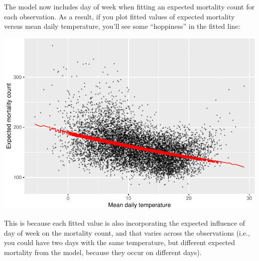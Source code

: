 \documentclass[
]{book}
\newenvironment{Shaded}{\begin{snugshade}}{\end{snugshade}}
\newcommand{\DataTypeTok}[1]{\textcolor[rgb]{0.13,0.29,0.53}{#1}}
\newcommand{\FloatTok}[1]{\textcolor[rgb]{0.00,0.00,0.81}{#1}}
\newcommand{\KeywordTok}[1]{\textcolor[rgb]{0.13,0.29,0.53}{\textbf{#1}}}
\newcommand{\NormalTok}[1]{#1}
\newcommand{\OperatorTok}[1]{\textcolor[rgb]{0.81,0.36,0.00}{\textbf{#1}}}
\newcommand{\StringTok}[1]{\textcolor[rgb]{0.31,0.60,0.02}{#1}}
\begin{document}
The model now includes day of week when fitting an expected mortality count
for each observation. As a result, if you plot fitted values of expected
mortality versus mean daily temperature, you'll see some ``hoppiness'' in the
fitted line:

\begin{Shaded}
\end{Shaded}

\includegraphics{adv_epi_analysis_files/figure-latex/unnamed-chunk-40-1.pdf}

This is because each fitted value is also incorporating the expected influence
of day of week on the mortality count, and that varies across the observations
(i.e., you could have two days with the same temperature, but different
expected mortality from the model, because they occur on different days).
\end{document}
